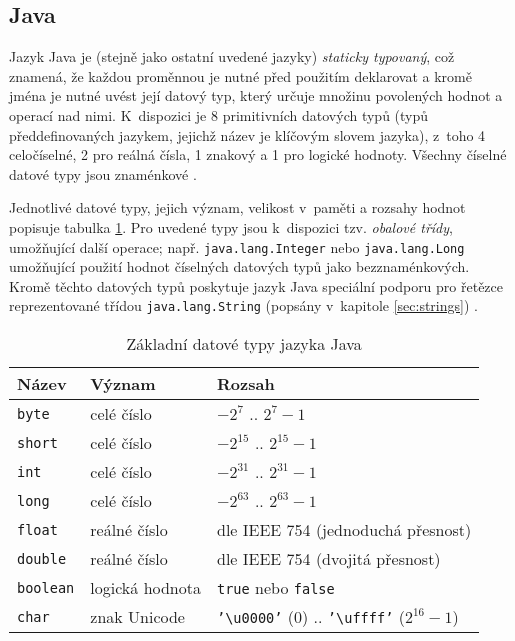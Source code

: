 \documentclass[onepage, a4paper, 12pt]{bakalarka}
\begin{document}
\subsection{Java}
Jazyk Java je (stejně jako ostatní uvedené jazyky) \textit{staticky typovaný}, což znamená, že každou proměnnou je nutné před použitím deklarovat a kromě jména je nutné uvést její datový typ, který určuje množinu povolených hodnot a operací nad nimi. K~dispozici je 8 primitivních datových typů (typů předdefinovaných jazykem, jejichž název je klíčovým slovem jazyka), z~toho 4 celočíselné, 2 pro reálná čísla, 1 znakový a 1 pro logické hodnoty. Všechny číselné datové typy jsou znaménkové \cite{java-book, java-guide-types}.\par

Jednotlivé datové typy, jejich význam, velikost v~paměti a rozsahy hodnot popisuje tabulka \ref{table:java-types}. Pro uvedené typy jsou k~dispozici tzv. \textit{obalové třídy}, umožňující další operace; např. \texttt{java.lang.Integer} nebo \texttt{java.lang.Long} umožňující použití hodnot číselných datových typů jako bezznaménkových. Kromě těchto datových typů poskytuje jazyk Java speciální podporu pro řetězce reprezentované třídou \texttt{java.lang.String} (popsány v~kapitole \ref{sec:strings}) \cite{java-guide-types, java-guide-byte, java-guide-short, java-guide-integer, java-guide-long, java-guide-float, java-guide-double, java-guide-boolean, java-guide-character}.

\begin{table}\centering
\caption{Základní datové typy jazyka Java}
\begin{tabular}{| l | l | l |}
\hline
\textbf{Název} & \textbf{Význam} & \textbf{Rozsah} \\ \hline
\texttt{byte} & celé číslo & $-2^7$ .. $2^7-1$ \\ \hline
\texttt{short} & celé číslo & $-2^{15}$ .. $2^{15}-1$ \\ \hline
\texttt{int} & celé číslo & $-2^{31}$ .. $2^{31}-1$ \\ \hline
\texttt{long} & celé číslo & $-2^{63}$ .. $2^{63}-1$ \\ \hline
\texttt{float} & reálné číslo & dle IEEE 754 (jednoduchá přesnost) \\ \hline
\texttt{double} & reálné číslo & dle IEEE 754 (dvojitá přesnost) \\ \hline
\texttt{boolean} & logická hodnota & \texttt{true} nebo \texttt{false} \\ \hline
\texttt{char} & znak Unicode & \texttt{'\textbackslash u0000'} ($0$) .. \texttt{'\textbackslash uffff'} ($2^{16} - 1$) \\ \hline
\end{tabular}
\label{table:java-types}
\end{table}
\end{document}
